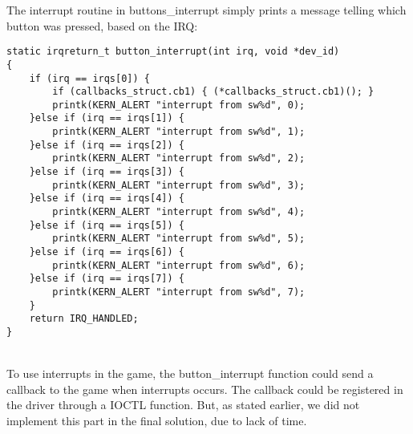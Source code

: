 The interrupt routine in buttons_interrupt simply prints a message telling which button was pressed, based on the IRQ:
\begin{lstlisting}
static irqreturn_t button_interrupt(int irq, void *dev_id)
{
	if (irq == irqs[0]) {
		if (callbacks_struct.cb1) { (*callbacks_struct.cb1)(); } 
		printk(KERN_ALERT "interrupt from sw%d", 0);
	}else if (irq == irqs[1]) {
		printk(KERN_ALERT "interrupt from sw%d", 1);
	}else if (irq == irqs[2]) {
		printk(KERN_ALERT "interrupt from sw%d", 2);
	}else if (irq == irqs[3]) {
		printk(KERN_ALERT "interrupt from sw%d", 3);
	}else if (irq == irqs[4]) {
		printk(KERN_ALERT "interrupt from sw%d", 4);
	}else if (irq == irqs[5]) {
		printk(KERN_ALERT "interrupt from sw%d", 5);
	}else if (irq == irqs[6]) {
		printk(KERN_ALERT "interrupt from sw%d", 6);
	}else if (irq == irqs[7]) {
		printk(KERN_ALERT "interrupt from sw%d", 7);
	}
	return IRQ_HANDLED;
}
\end{lstlisting}

\\To use interrupts in the game, the button_interrupt function could send a callback to the game when interrupts occurs. The callback could be registered in the driver through a IOCTL function. But, as stated earlier, we did not implement this part in the final solution, due to lack of time.
